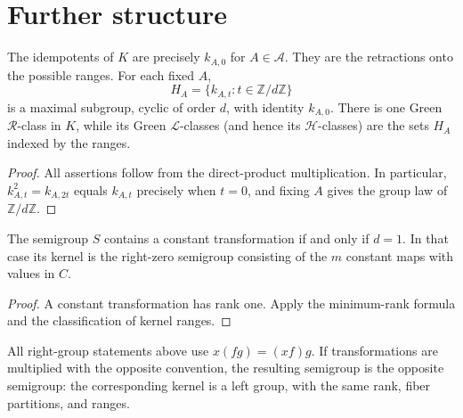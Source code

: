 
\section{Further structure}
\begin{corollary}
The idempotents of $K$ are precisely $k_{A,0}$ for $A\in\mathcal A$.
They are the retractions onto the possible ranges. For each fixed $A$,
\[
 H_A=\{k_{A,t}:t\in\mathbb{Z}/d\mathbb{Z}\}
\]
is a maximal subgroup, cyclic of order $d$, with identity $k_{A,0}$.
There is one Green $\mathcal R$-class in $K$, while its Green
$\mathcal L$-classes (and hence its $\mathcal H$-classes) are the sets
$H_A$ indexed by the ranges.
\end{corollary}
\begin{proof}
All assertions follow from the direct-product multiplication.
In particular, $k_{A,t}^2=k_{A,2t}$ equals $k_{A,t}$ precisely when
$t=0$, and fixing $A$ gives the group law of $\mathbb{Z}/d\mathbb{Z}$.
\end{proof}

\begin{corollary}
The semigroup $S$ contains a constant transformation if and only if
$d=1$. In that case its kernel is the right-zero semigroup consisting
of the $m$ constant maps with values in $C$.
\end{corollary}
\begin{proof}
A constant transformation has rank one. Apply the minimum-rank formula
and the classification of kernel ranges.
\end{proof}

\begin{remark}
All right-group statements above use $x(fg)=(xf)g$. If transformations
are multiplied with the opposite convention, the resulting semigroup
is the opposite semigroup: the corresponding kernel is a left group,
with the same rank, fiber partitions, and ranges.
\end{remark}
